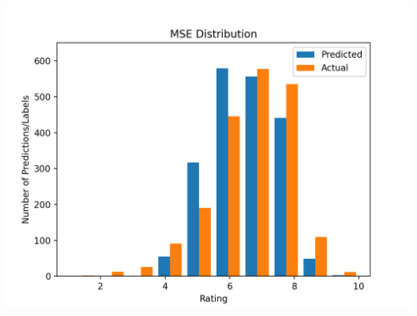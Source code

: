 \documentclass[11pt]{article}
\begin{document}
\begin{minipage}{0.45\textwidth}
\mbox{}\\
\includegraphics[scale=0.5]{bert/histogram.png}
\end{minipage}
\end{document}
